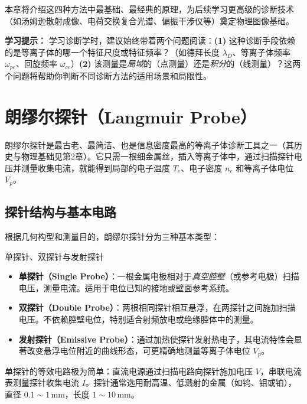 \documentclass[12pt,a4paper,openany,oneside]{book}
\begin{document}
本章将介绍这四种方法中最基础、最经典的原理，为后续学习更高级的诊断技术（如汤姆逊散射成像、电荷交换复合光谱、偏振干涉仪等）奠定物理图像基础。

\begin{tip}
\textbf{学习提示：}
学习诊断学时，建议始终带着两个问题阅读：\textbf{(1)} 这种诊断手段依赖的是等离子体的哪一个特征尺度或特征频率？（如德拜长度 $\lambda_D$、等离子体频率 $\omega_{pe}$、回旋频率 $\omega_{ce}$）\textbf{(2)} 该测量是\emph{局域}的（点测量）还是\emph{积分}的（线测量）？这两个问题将帮助你判断不同诊断方法的适用场景和局限性。
\end{tip}


\section{朗缪尔探针（Langmuir Probe）}
\label{sec:12.2}

朗缪尔探针是最古老、最简洁、也是信息密度最高的等离子体诊断工具之一（其历史与物理基础见第2章）。它只需一根细金属丝，插入等离子体中，通过扫描探针电压并测量收集电流，就能得到局部的电子温度 $T_e$、电子密度 $n_e$ 和等离子体电位 $V_p$。

\subsection{探针结构与基本电路}

根据几何构型和测量目的，朗缪尔探针分为三种基本类型：

\begin{definition}{单探针、双探针与发射探针}{}{}
\begin{itemize}
    \item \textbf{单探针（Single Probe）}：一根金属电极相对于\emph{真空腔壁}（或参考电极）扫描电压，测量电流。适用于电位已知的接地或壁面参考系统。
    \item \textbf{双探针（Double Probe）}：两根相同探针相互悬浮，在两探针之间施加扫描电压。不依赖腔壁电位，特别适合射频放电或绝缘腔体中的测量。
    \item \textbf{发射探针（Emissive Probe）}：通过加热使探针发射热电子，其电流特性会显著改变悬浮电位附近的曲线形态，可更精确地测量等离子体电位 $V_p$。
\end{itemize}
\end{definition}

单探针的等效电路极为简单：直流电源通过扫描电路向探针施加电压 $V$，串联电流表测量探针收集电流 $I$。探针通常选用耐高温、低溅射的金属（如钨、钼或铂），直径 $0.1\sim 1\,\mathrm{mm}$，长度 $1\sim 10\,\mathrm{mm}$。
\end{document}
